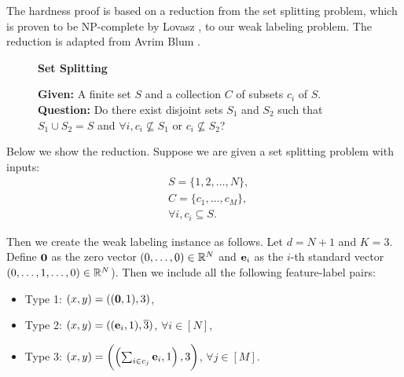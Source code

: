
The hardness proof is based on a reduction from the set splitting problem, which is proven to be NP-complete by Lovasz , to our weak labeling problem. The reduction is adapted from Avrim Blum . 
\begin{figure}[h]
\begin{framed}
\begin{center}
    \textbf{Set Splitting}
\end{center}
\textbf{Given: } A finite set $S$ and a collection $C$ of subsets $c_i$ of $S$. \\
\textbf{Question: } Do there exist disjoint sets $S_1$ and $S_2$ such that $S_1 \cup S_2 = S$ and $\forall i, c_i\not\subseteq S_1$ or $c_i\not\subseteq S_2$? 
\end{framed}
\end{figure}

Below we show the reduction. Suppose we are given a set splitting problem with inputs: 
\begin{align*}
    &S = \{1, 2, \ldots, N\}, \\
    &C = \{c_1, \ldots, c_M\}, \\ 
    &\forall i, c_i \subseteq S. 
\end{align*}

Then we create the weak labeling instance as follows. Let $d=N+1$ and $K=3$. Define $\mathbf{0}$ as the zero vector $(0,\ldots, 0)\in \mathbb{R}^N$ and $\mathbf{e}_i$ as the $i$-th standard vector $(0,\ldots, 1, \ldots, 0)\in \mathbb{R}^N$). Then we include all the following feature-label pairs: 
\begin{itemize}
    \item Type 1: $(x,y)=((\mathbf{0},1), 3)$,
    \item Type 2: $(x,y)=((\mathbf{e}_i,1), \overline{3})$, $\forall i\in [N]$,
    \item Type 3: $(x,y)=\left(\left(\sum_{i\in c_j} \mathbf{e}_i, 1\right), 3\right)$, $\forall j\in[M]$.  
\end{itemize}

